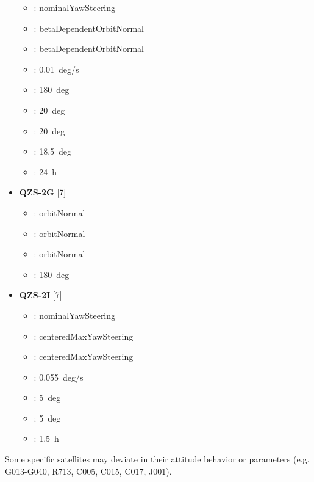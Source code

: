 \begin{itemize}
\begin{itemize}
  \item {}: nominalYawSteering
  \item {}: betaDependentOrbitNormal
  \item {}: betaDependentOrbitNormal
  \item {}: 0.01~deg/s
  \item {}: 180~deg
  \item {}: 20~deg
  \item {}: 20~deg
  \item {}: 18.5~deg
  \item {}: 24~h
\end{itemize}
\item \textbf{QZS-2G} [7]
\begin{itemize}
  \item {}: orbitNormal
  \item {}: orbitNormal
  \item {}: orbitNormal
  \item {}: 180~deg
\end{itemize}
\item \textbf{QZS-2I} [7]
\begin{itemize}
  \item {}: nominalYawSteering
  \item {}: centeredMaxYawSteering
  \item {}: centeredMaxYawSteering
  \item {}: 0.055~deg/s
  \item {}: 5~deg
  \item {}: 5~deg
  \item {}: 1.5~h
\end{itemize}
\end{itemize}

Some specific satellites may deviate in their attitude behavior or parameters
(e.g. G013-G040, R713, C005, C015, C017, J001).

